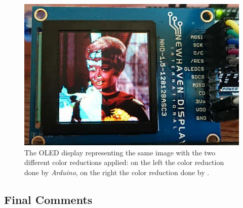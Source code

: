 \documentclass[a4paper]{article}
\begin{document}
            \begin{figure}[htp]
                \centering
                \includegraphics[width=0.4 \columnwidth]{./screenshots/ColorReductionComparison}
                \caption{
                        \label{fig:ColorReductionComparison}
                        The OLED display representing the same image with the two different color reductions applied: on the left the color reduction done by \emph{Arduino}, on the right the color reduction done by .
                }
            \end{figure}


    \subsection{Final Comments}
\end{document}
